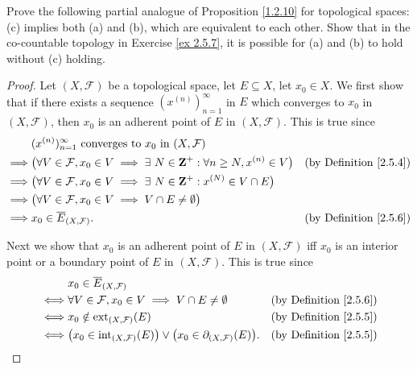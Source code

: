 \begin{exercise}\label{ex 2.5.10}
    Prove the following partial analogue of Proposition \ref{1.2.10} for topological spaces:
    (c) implies both (a) and (b), which are equivalent to each other.
    Show that in the co-countable topology in Exercise \ref{ex 2.5.7}, it is possible for (a) and (b) to hold without (c) holding.
\end{exercise}

\begin{proof}
    Let \((X, \mathcal{F})\) be a topological space, let \(E \subseteq X\), let \(x_0 \in X\).
    We first show that if there exists a sequence \((x^{(n)})_{n = 1}^\infty\) in \(E\) which converges to \(x_0\) in \((X, \mathcal{F})\), then \(x_0\) is an adherent point of \(E\) in \((X, \mathcal{F})\).
    This is true since
    \begin{align*}
                 & (x^{(n)})_{n = 1}^\infty \text{ converges to } x_0 \text{ in } (X, \mathcal{F})                                                                    \\
        \implies & \big(\forall V \in \mathcal{F}, x_0 \in V \implies \exists\ N \in \mathbf{Z}^+ : \forall n \geq N, x^{(n)} \in V\big) & \text{(by Definition \ref{2.5.4})} \\
        \implies & \big(\forall V \in \mathcal{F}, x_0 \in V \implies \exists\ N \in \mathbf{Z}^+ : x^{(N)} \in V \cap E\big)                                                 \\
        \implies & \big(\forall V \in \mathcal{F}, x_0 \in V \implies V \cap E \neq \emptyset\big)                                                                    \\
        \implies & x_0 \in \overline{E}_{(X, \mathcal{F})}.                                                                      & \text{(by Definition \ref{2.5.6})}
    \end{align*}

    Next we show that \(x_0\) is an adherent point of \(E\) in \((X, \mathcal{F})\) iff \(x_0\) is an interior point or a boundary point of \(E\) in \((X, \mathcal{F})\).
    This is true since
    \begin{align*}
             & x_0 \in \overline{E}_{(X, \mathcal{F})}                                                                                                        \\
        \iff & \forall V \in \mathcal{F}, x_0 \in V \implies V \cap E \neq \emptyset                                     & \text{(by Definition \ref{2.5.6})} \\
        \iff & x_0 \notin \text{ext}_{(X, \mathcal{F})}(E)                                                               & \text{(by Definition \ref{2.5.5})} \\
        \iff & \big(x_0 \in \text{int}_{(X, \mathcal{F})}(E)\big) \lor \big(x_0 \in \partial_{(X, \mathcal{F})}(E)\big). & \text{(by Definition \ref{2.5.5})}
    \end{align*}


\end{proof}

